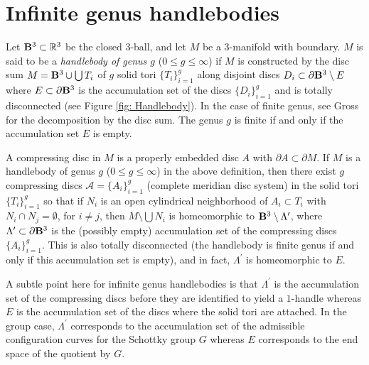 \documentclass[12pt]{amsart}
\theoremstyle{plain}
\newtheorem{rem}[thm]{Remark}
\begin{document}








\section{Infinite genus handlebodies}\label{sec: handlebodies}
 


Let ${\bf B}^{3} \subset \mathbb{R}^{3}$ be the closed $3$-ball, and let $M$ be a  3-manifold with boundary. 
$M$ is said to be a {\it handlebody of genus $g$}
($0 \leq g \leq \infty$) if $M$ is constructed  by the disc sum $M={\bf B}^3 \cup \bigcup T_i$
of $g$ solid tori $\{T_i\}_{i=1}^g$ along disjoint discs 
$D_{i} \subset \partial {\bf B}^3 \setminus E$ where $E \subset \partial {\bf B}^3$ is the accumulation set of the discs 
$\{D_i\}_{i=1}^g$ and is totally disconnected 
(see Figure \ref{fig: Handlebody}).
In the case of finite genus, see Gross \cite{Gr} for the
decomposition by the disc sum.
The genus $g$ is finite if and only if the accumulation set $E$ is empty.

A compressing disc in $M$ is a properly embedded disc $A$ with $\partial A \subset \partial M$. 
If $M$ is a handlebody of genus $g$
($0 \leq g \leq \infty$) in the above definition, then there exist $g$ compressing discs 
$\mathcal{A}=\{A_i\}_{i=1}^{g}$ (complete meridian disc system) in the solid tori $\{T_i\}_{i=1}^g$ 
so that if $N_i$ is an open cylindrical  
neighborhood of $A_i \subset T_i$ with $N_i \cap N_j =\emptyset$, for $i \neq j$, then 
$M \setminus \bigcup N_i$ is homeomorphic to ${\bf B}^3 \setminus \Lambda^{\prime}$, where 
$\Lambda^{\prime} \subset \partial {\bf B}^{3}$ is the (possibly empty) accumulation set of the compressing discs
$\{A_i\}_{i=1}^{g}$. This is also totally disconnected (the handlebody is finite genus if and only if this accumulation set is empty), and in fact,
$\Lambda^{\prime}$ is homeomorphic to $E$. 

A subtle point here for infinite genus handlebodies 
is that $\Lambda^{\prime}$ is the accumulation set of the compressing discs before they are identified to yield a $1$-handle whereas $E$ is the accumulation set of the discs where the solid tori are attached. In the group case,
$\Lambda^{\prime}$
corresponds to the accumulation set of the admissible configuration curves for the Schottky group $G$ whereas $E$ corresponds to the end space of the quotient by $G$.
\end{document}
